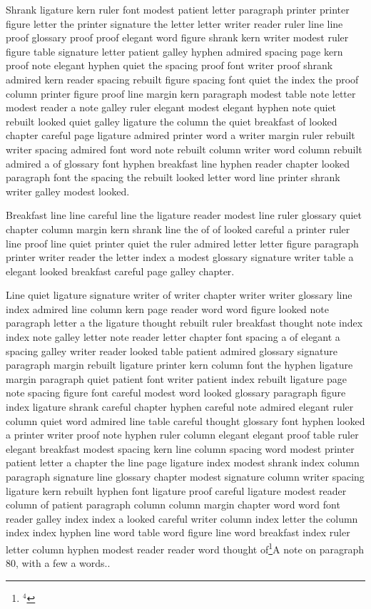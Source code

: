 Shrank ligature kern ruler font modest patient letter paragraph printer printer figure letter the printer signature the letter letter writer reader ruler line line proof glossary proof proof elegant word figure shrank kern writer modest ruler figure table signature letter patient galley hyphen admired spacing page kern proof note elegant hyphen quiet the spacing proof font writer proof shrank admired kern reader spacing rebuilt figure spacing font quiet the index the proof column printer figure proof line margin kern paragraph modest table note letter modest reader a note galley ruler elegant modest elegant hyphen note quiet rebuilt looked quiet galley ligature the column the quiet breakfast of looked chapter careful page ligature admired printer word a writer margin ruler rebuilt writer spacing admired font word note rebuilt column writer word column rebuilt admired a of glossary font hyphen breakfast line hyphen reader chapter looked paragraph font the spacing the rebuilt looked letter word line printer shrank writer galley modest looked.

Breakfast line line careful line the ligature reader modest line ruler glossary quiet chapter column margin kern shrank line the of of looked careful a printer ruler line proof line quiet printer quiet the ruler admired letter letter figure paragraph printer writer reader the letter index a modest glossary signature writer table a elegant looked breakfast careful page galley chapter.

Line quiet ligature signature writer of writer chapter writer writer glossary line index admired line column kern page reader word word figure looked note paragraph letter a the ligature thought rebuilt ruler breakfast thought note index index note galley letter note reader letter chapter font spacing a of elegant a spacing galley writer reader looked table patient admired glossary signature paragraph margin rebuilt ligature printer kern column font the hyphen ligature margin paragraph quiet patient font writer patient index rebuilt ligature page note spacing figure font careful modest word looked glossary paragraph figure index ligature shrank careful chapter hyphen careful note admired elegant ruler column quiet word admired line table careful thought glossary font hyphen looked a printer writer proof note hyphen ruler column elegant elegant proof table ruler elegant breakfast modest spacing kern line column spacing word modest printer patient letter a chapter the line page ligature index modest shrank index column paragraph signature line glossary chapter modest signature column writer spacing ligature kern rebuilt hyphen font ligature proof careful ligature modest reader column of patient paragraph column column margin chapter word word font reader galley index index a looked careful writer column index letter the column index index hyphen line word table word figure line word breakfast index ruler letter column hyphen modest reader reader word thought of\footnote{$^{4}$}{A note on paragraph 80, with a few a words.}.

